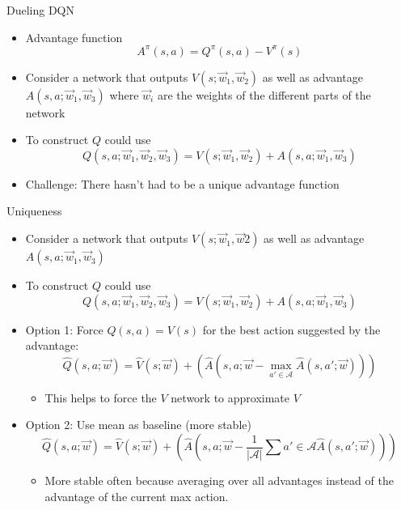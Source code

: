 \begin{frame}[c]{Dueling DQN }
	
	\begin{itemize}
	\item Advantage function 
	$$A^\pi (s,a) = Q^\pi(s,a) - V^\pi(s) $$
	\item Consider a network that outputs $V(s; \vec{w}_1, \vec{w}_2)$ as well as advantage $A(s,a; \vec{w}_1, \vec{w}_3)$ where $\vec{w}_i$ are the weights of the different parts of the network
	\item To construct $Q$ could use $$Q(s,a;\vec{w}_1, \vec{w}_2, \vec{w}_3) = V(s;\vec{w}_1, \vec{w}_2) + A(s,a;\vec{w}_1, \vec{w}_3)$$
	\bigskip
	\pause
	\item Challenge: There hasn't had to be a unique advantage function

	\end{itemize}
	
\end{frame}
\begin{frame}[c]{Uniqueness}
	
	\begin{itemize}
		\item Consider a network that outputs $V(s;\vec{w}_1, \vec{w}2)$ as well as advantage $A(s,a; \vec{w}_1, \vec{w}_3)$
		\item To construct $Q$ could use $$Q(s,a;\vec{w}_1, \vec{w}_2, \vec{w}_3) = V(s;\vec{w}_1, \vec{w}_2) + A(s,a;\vec{w}_1, \vec{w}_3)$$
		\item Option 1: Force $Q(s,a) = V(s)$ for the best action suggested by the advantage:
		$$\hat{Q}(s,a;\vec{w}) = \hat{V}(s;\vec{w}) + \left( \hat{A}(s,a;\vec{w} - \max_{a' \in \mathcal{A}} \hat{A}(s,a';\vec{w})) \right) $$
		\vspace{-1em}
		\begin{itemize}
			\item This helps to force the $V$ network to approximate $V$
		\end{itemize}
		\item Option 2: Use mean as baseline (more stable)
		$$\hat{Q}(s,a;\vec{w}) = \hat{V}(s;\vec{w}) + \left( \hat{A}(s,a;\vec{w} - \frac{1}{|\mathcal{A}|} \sum{a' \in \mathcal{A}} \hat{A}(s,a';\vec{w})) \right) $$
		\vspace{-1em}
		\begin{itemize}
			\item More stable often because averaging over all advantages instead of
			the advantage of the current max action.
		\end{itemize}
	\end{itemize}
	
\end{frame}
